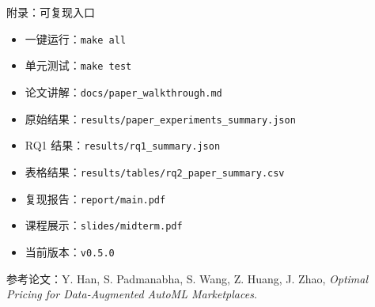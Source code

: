 \documentclass[aspectratio=169,10pt]{ctexbeamer}
\begin{document}
\begin{frame}{附录：可复现入口}
\begin{itemize}
  \item 一键运行：\texttt{make all}
  \item 单元测试：\texttt{make test}
  \item 论文讲解：\texttt{docs/paper\_walkthrough.md}
  \item 原始结果：\texttt{results/paper\_experiments\_summary.json}
  \item RQ1 结果：\texttt{results/rq1\_summary.json}
  \item 表格结果：\texttt{results/tables/rq2\_paper\_summary.csv}
  \item 复现报告：\texttt{report/main.pdf}
  \item 课程展示：\texttt{slides/midterm.pdf}
  \item 当前版本：\texttt{v0.5.0}
\end{itemize}
\vspace{0.8em}
\small
参考论文：Y. Han, S. Padmanabha, S. Wang, Z. Huang, J. Zhao,
\emph{Optimal Pricing for Data-Augmented AutoML Marketplaces}.
\end{frame}
\end{document}
